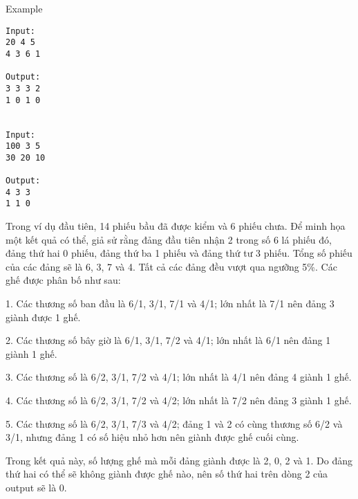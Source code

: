 Example
\begin{verbatim}
Input:
20 4 5
4 3 6 1

Output:
3 3 3 2
1 0 1 0


Input:
100 3 5
30 20 10

Output:
4 3 3
1 1 0

\end{verbatim}

   Trong ví dụ đầu tiên, 14 phiếu bầu đã được kiểm và 6 phiếu chưa. Để minh họa một kết quả có thể, giả sử rằng đảng đầu tiên nhận 2 trong số 6 lá phiếu đó, đảng thứ hai 0 phiếu, đảng thứ ba 1 phiếu và đảng thứ tư 3 phiếu. Tổng số phiếu của các đảng sẽ là 6, 3, 7 và 4. Tất cả các đảng đều vượt qua ngưỡng 5\%. Các ghế được phân bố như sau:  
\begin{itemize}

    1. Các thương số ban đầu là 6/1, 3/1, 7/1 và 4/1; lớn nhất là 7/1 nên đảng 3 giành được 1 ghế.   

    2. Các thương số bây giờ là 6/1, 3/1, 7/2 và 4/1; lớn nhất là 6/1 nên đảng 1 giành 1 ghế.   

    3. Các thương số là 6/2, 3/1, 7/2 và 4/1; lớn nhất là 4/1 nên đảng 4 giành 1 ghế.   

    4. Các thương số là 6/2, 3/1, 7/2 và 4/2; lớn nhất là 7/2 nên đảng 3 giành 1 ghế.   

    5. Các thương số là 6/2, 3/1, 7/3 và 4/2; đảng 1 và 2 có cùng thương số 6/2 và 3/1, nhưng đảng 1 có số hiệu nhỏ hơn nên giành được ghế cuối cùng.   
\end{itemize}

   Trong kết quả này, số lượng ghế mà mỗi đảng giành được là 2, 0, 2 và 1. Do đảng thứ hai có thể sẽ không giành được ghế nào, nên số thứ hai trên dòng 2 của output sẽ là 0.